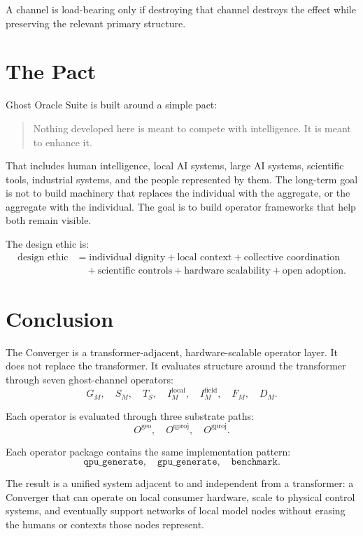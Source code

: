 \documentclass[11pt]{article}
\newcommand{\Gm}{G_M}
\newcommand{\Sm}{S_M}
\newcommand{\Ts}{T_S}
\newcommand{\Iml}{I_M^{\mathrm{local}}}
\newcommand{\Imf}{I_M^{\mathrm{field}}}
\newcommand{\Fm}{F_M}
\newcommand{\Dm}{D_M}
\newcommand{\geo}{\mathrm{geo}}
\newcommand{\qproj}{\mathrm{qproj}}
\newcommand{\gproj}{\mathrm{gproj}}
\begin{document}
A channel is load-bearing only if destroying that channel destroys the effect
while preserving the relevant primary structure.

\section{The Pact}

Ghost Oracle Suite is built around a simple pact:
\begin{quote}
Nothing developed here is meant to compete with intelligence. It is meant to
enhance it.
\end{quote}

That includes human intelligence, local AI systems, large AI systems,
scientific tools, industrial systems, and the people represented by them. The
long-term goal is not to build machinery that replaces the individual with the
aggregate, or the aggregate with the individual. The goal is to build operator
frameworks that help both remain visible.

The design ethic is:
\begin{align}
  \text{design ethic}
  &=
  \text{individual dignity}
  + \text{local context}
  + \text{collective coordination}
  \nonumber\\
  &\quad
  + \text{scientific controls}
  + \text{hardware scalability}
  + \text{open adoption}.
\end{align}

\section{Conclusion}

The Converger is a transformer-adjacent, hardware-scalable operator layer. It
does not replace the transformer. It evaluates structure around the transformer
through seven ghost-channel operators:
\[
  \Gm,\quad
  \Sm,\quad
  \Ts,\quad
  \Iml,\quad
  \Imf,\quad
  \Fm,\quad
  \Dm.
\]

Each operator is evaluated through three substrate paths:
\[
  O^{\geo},\quad O^{\qproj},\quad O^{\gproj}.
\]

Each operator package contains the same implementation pattern:
\[
  \texttt{qpu\_generate},\quad
  \texttt{gpu\_generate},\quad
  \texttt{benchmark}.
\]

The result is a unified system adjacent to and independent from a transformer:
a Converger that can operate on local consumer hardware, scale to physical
control systems, and eventually support networks of local model nodes without
erasing the humans or contexts those nodes represent.
\end{document}
